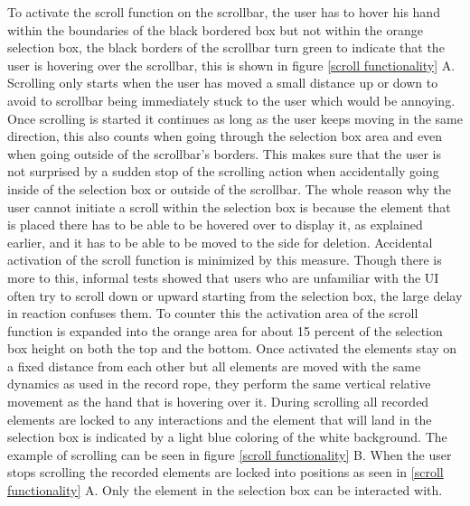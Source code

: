 To activate the scroll function on the scrollbar, the user has to hover his hand within the boundaries of the black bordered box but not within the orange selection box, the black borders of the scrollbar turn green to indicate that the user is hovering over the scrollbar, this is shown in figure \ref{scroll functionality} A. Scrolling only starts when the user has moved a small distance up or down to avoid to scrollbar being immediately stuck to the user which would be annoying. Once scrolling is started it continues as long as the user keeps moving in the same direction, this also counts when going through the selection box area and even when going outside of the scrollbar's borders. This makes sure that the user is not surprised by a sudden stop of the scrolling action when accidentally going inside of the selection box or outside of the scrollbar. The whole reason why the user cannot initiate a scroll within the selection box is because the element that is placed there has to be able to be hovered over to display it, as explained earlier, and it has to be able to be moved to the side for deletion. Accidental activation of the scroll function is minimized by this measure. Though there is more to this, informal tests showed that users who are unfamiliar with the UI often try to scroll down or upward starting from the selection box, the large delay in reaction confuses them. To counter this the activation area of the scroll function is expanded into the orange area for about 15 percent of the selection box height on both the top and the bottom. Once activated the elements stay on a fixed distance from each other but all elements are moved with the same dynamics as used in the record rope, they perform the same vertical relative movement as the hand that is hovering over it. During scrolling all recorded elements are locked to any interactions and the element that will land in the selection box is indicated by a light blue coloring of the white background. The example of scrolling can be seen in figure \ref{scroll functionality} B. When the user stops scrolling the recorded elements are locked into positions as seen in \ref{scroll functionality} A. Only the element in the selection box can be interacted with.\\


